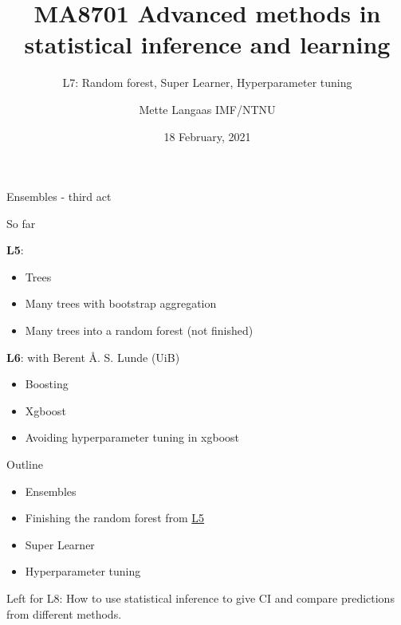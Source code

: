 \documentclass[
  ignorenonframetext,
]{beamer}
\title{MA8701 Advanced methods in statistical inference and learning}
\subtitle{L7: Random forest, Super Learner, Hyperparameter tuning}
\author{Mette Langaas IMF/NTNU}
\date{18 February, 2021}
\providecommand{\tightlist}{%
  \setlength{\itemsep}{0pt}\setlength{\parskip}{0pt}}
\begin{document}
\frame{\titlepage}

\begin{frame}{Ensembles - third act}
\protect\hypertarget{ensembles---third-act}{}

\begin{block}{So far}

\textbf{L5}:

\begin{itemize}
\tightlist
\item
  Trees
\item
  Many trees with bootstrap aggregation
\item
  Many trees into a random forest (not finished)
\end{itemize}

\textbf{L6}: with Berent Å. S. Lunde (UiB)

\begin{itemize}
\tightlist
\item
  Boosting
\item
  Xgboost
\item
  Avoiding hyperparameter tuning in xgboost
\end{itemize}

\end{block}

\end{frame}

\begin{frame}

\begin{block}{Outline}

\begin{itemize}
\tightlist
\item
  Ensembles
\item
  Finishing the random forest from
  \href{http://htmlpreview.github.com/?https://github.com/mettelang/MA8701V2021/blob/main/Part2/L5.html}{L5}
\item
  Super Learner
\item
  Hyperparameter tuning
\end{itemize}

Left for L8: How to use statistical inference to give CI and compare
predictions from different methods.

\end{block}

\end{frame}
\end{document}
